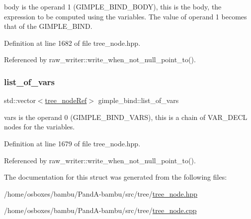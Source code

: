 body is the operand 1 (G\+I\+M\+P\+L\+E\+\_\+\+B\+I\+N\+D\+\_\+\+B\+O\+DY), this is the body, the expression to be computed using the variables. The value of operand 1 becomes that of the G\+I\+M\+P\+L\+E\+\_\+\+B\+I\+ND. 



Definition at line 1682 of file tree\+\_\+node.\+hpp.



Referenced by raw\+\_\+writer\+::write\+\_\+when\+\_\+not\+\_\+null\+\_\+point\+\_\+to().

\mbox{\label{structgimple__bind_a19461de5e043437e4d852cd2d1223548}} 
\subsubsection{\texorpdfstring{list\+\_\+of\+\_\+vars}{list\_of\_vars}}
{\footnotesize\ttfamily std\+::vector$<$\hyperlink{tree__node_8hpp_a6ee377554d1c4871ad66a337eaa67fd5}{tree\+\_\+node\+Ref}$>$ gimple\+\_\+bind\+::list\+\_\+of\+\_\+vars}



vars is the operand 0 (G\+I\+M\+P\+L\+E\+\_\+\+B\+I\+N\+D\+\_\+\+V\+A\+RS), this is a chain of V\+A\+R\+\_\+\+D\+E\+CL nodes for the variables. 



Definition at line 1679 of file tree\+\_\+node.\+hpp.



Referenced by raw\+\_\+writer\+::write\+\_\+when\+\_\+not\+\_\+null\+\_\+point\+\_\+to().



The documentation for this struct was generated from the following files\+:\begin{DoxyCompactItemize}
\item 
/home/osboxes/bambu/\+Pand\+A-\/bambu/src/tree/\hyperlink{tree__node_8hpp}{tree\+\_\+node.\+hpp}\item 
/home/osboxes/bambu/\+Pand\+A-\/bambu/src/tree/\hyperlink{tree__node_8cpp}{tree\+\_\+node.\+cpp}\end{DoxyCompactItemize}
